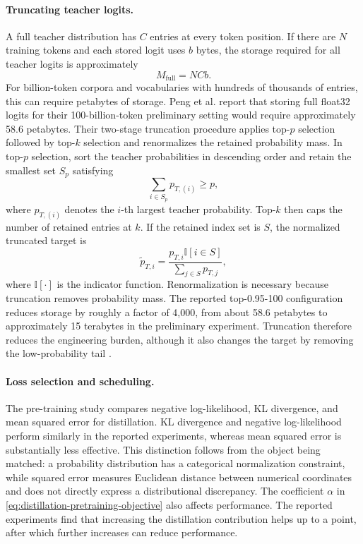 \paragraph{Truncating teacher logits.}
A full teacher distribution has \(C\) entries at every token position.  If
there are \(N\) training tokens and each stored logit uses \(b\) bytes, the
storage required for all teacher logits is approximately
\begin{equation}
    M_{\mathrm{full}}=NCb.
    \label{eq:distillation-logit-storage}
\end{equation}
For billion-token corpora and vocabularies with hundreds of thousands of
entries, this can require petabytes of storage.  Peng et al. report that
storing full float32 logits for their 100-billion-token preliminary setting
would require approximately 58.6 petabytes.  Their two-stage truncation
procedure applies top-\(p\) selection followed by top-\(k\) selection and
renormalizes the retained probability mass.  In top-\(p\) selection, sort
the teacher probabilities in descending order and retain the smallest set
\(S_p\) satisfying
\begin{equation}
    \sum_{i\in S_p}p_{T,(i)}\geq p,
    \label{eq:distillation-top-p}
\end{equation}
where \(p_{T,(i)}\) denotes the \(i\)-th largest teacher probability.
Top-\(k\) then caps the number of retained entries at \(k\).  If the
retained index set is \(S\), the normalized truncated target is
\begin{equation}
    \widetilde p_{T,i}
    =\frac{p_{T,i}\mathbb I[i\in S]}
    {\displaystyle\sum_{j\in S}p_{T,j}},
    \label{eq:distillation-truncated-target}
\end{equation}
where \(\mathbb I[\cdot]\) is the indicator function.  Renormalization
is necessary because truncation removes probability mass.  The reported
top-0.95-100 configuration reduces storage by roughly a factor of 4,000,
from about 58.6 petabytes to approximately 15 terabytes in the preliminary
experiment.  Truncation therefore reduces the engineering burden, although
it also changes the target by removing the low-probability tail
\parencite{Peng2024PretrainingDistillation}.

\paragraph{Loss selection and scheduling.}
The pre-training study compares negative log-likelihood, KL divergence, and
mean squared error for distillation.  KL divergence and negative
log-likelihood perform similarly in the reported experiments, whereas mean
squared error is substantially less effective.  This distinction follows
from the object being matched: a probability distribution has a categorical
normalization constraint, while squared error measures Euclidean distance
between numerical coordinates and does not directly express a distributional
discrepancy.  The coefficient \(\alpha\) in
\cref{eq:distillation-pretraining-objective} also affects performance.
The reported experiments find that increasing the distillation contribution
helps up to a point, after which further increases can reduce performance.

